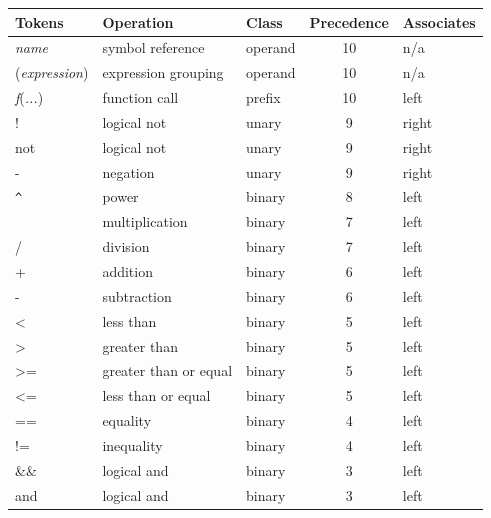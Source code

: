 \documentclass[10pt]{cekarticle}
\begin{document}
\begin{table}[tbh]
  \vspace*{8pt}
  \begin{center}
    \begin{tabular}{>{\ttfamily}lllcl}
      \toprule
      \textbf{Tokens} & \textbf{Operation} & \textbf{Class} & \textbf{Precedence} & \textbf{Associates} \\
      \midrule
      \emph{name} 	& symbol reference & operand & 10 & n/a \\
      (\emph{expression}) & expression grouping & operand & 10 & n/a\\
      \emph{f}(\emph{...}) & function call & prefix & 10 & left\\
      \color{red} ! 	& \color{red} logical not & \color{red} unary & \color{red} 9 & \color{red} right\\
      \color{green} not & \color{green} logical not & \color{green} unary & \color{green} 9 & \color{green} right\\
      - 		& negation & unary & 9 & right\\
      \verb|^| 		& power & binary & 8 & left \\
      * 		& multiplication & binary & 7 & left\\
      / 		& division & binary & 7 & left\\
      + 		& addition & binary & 6 & left\\
      - 		& subtraction & binary & 6 & left\\
      \color{red} <	& \color{red} less than & \color{red} binary & \color{red} 5 & \color{red} left\\
      \color{red} > 	& \color{red} greater than & \color{red} binary & \color{red} 5 & \color{red} left\\
      \color{red} >= 	& \color{red} greater than or equal & \color{red} binary & \color{red} 5 & \color{red} left\\
      \color{red} <= 	& \color{red} less than or equal & \color{red} binary & \color{red} 5 & \color{red} left\\
      \color{red} == 	& \color{red} equality & \color{red} binary & \color{red} 4 & \color{red} left\\
      \color{red} != 	& \color{red} inequality & \color{red} binary & \color{red} 4 & \color{red} left\\
      \color{red} \&\& 	& \color{red} logical and & \color{red} binary & \color{red} 3 & \color{red} left\\
      \color{green} and & \color{green} logical and & \color{green} binary & \color{green} 3 & \color{green} left\\

\end{tabular}
\end{center}
\end{table}
\end{document}
